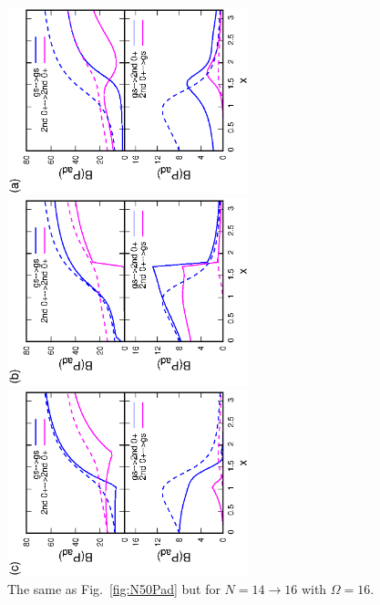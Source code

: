 \documentclass[%
superscriptaddress,
preprint,
showpacs,
nofootinbib,
amsmath,amssymb,
aps,
prc,
floatfix ]%
{revtex4-1}
\begin{document}
\begin{figure}[htbp]
 \begin{minipage}{0.3\hsize}
 \begin{center}
  \includegraphics[width=70mm,angle=-90]{N16Pad_CQ.eps}
 \end{center}
 \captionsetup{labelformat=empty,labelsep=none}
 \end{minipage}
 \begin{minipage}{0.3\hsize}
 \begin{center}
  \includegraphics[width=70mm,angle=-90]{N16Pad_FD.eps}
 \end{center}
 \captionsetup{labelformat=empty,labelsep=none}
 \end{minipage}
 \begin{minipage}{0.3\hsize}
 \begin{center}
  \includegraphics[width=70mm,angle=-90]{N16Pad_SPA.eps}
 \end{center}
 \captionsetup{labelformat=empty,labelsep=none}
 \end{minipage}
	\caption{The same as Fig.~\ref{fig:N50Pad} but for $N=14\rightarrow 16$
	with $\Omega=16$.
}
 \label{fig:N16Pad}
\end{figure}
\end{document}
